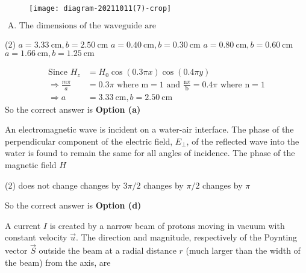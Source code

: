 \begin{enumerate}
\begin{minipage}{\textwidth}
		\begin{figure}[H]
			\centering
			\texttt{[image: diagram-20211011(7)-crop]}
		\end{figure}
	\end{minipage}
	$\text { A. The dimensions of the waveguide are }$
	\begin{tasks}(2)
		\task[\textbf{a.}] $a=3.33 \mathrm{~cm}, b=2.50 \mathrm{~cm}$
		\task[\textbf{b.}]$a=0.40 \mathrm{~cm}, b=0.30 \mathrm{~cm}$
		\task[\textbf{c.}]$a=0.80 \mathrm{~cm}, b=0.60 \mathrm{~cm}$
		\task[\textbf{d.}] $a=1.66 \mathrm{~cm}, b=1.25 \mathrm{~cm}$
	\end{tasks}
	\begin{answer}
		\begin{align*}
		\text{Since }H_{z}&=H_{0} \cos (0.3 \pi x) \cos (0.4 \pi y)\\
		\Rightarrow \frac{m \pi}{a}&=0.3 \pi\text{ where }\mathrm{m}=1\text{ and }\frac{\mathrm{n} \pi}{\mathrm{b}}=0.4 \pi\text{ where }\mathrm{n}=1\\
		\Rightarrow a&=3.33 \mathrm{~cm}, b=2.50 \mathrm{~cm}
		\end{align*}
		So the correct answer is \textbf{Option (a)}
	\end{answer}
	\begin{minipage}{\textwidth}
		\item An electromagnetic wave is incident on a water-air interface. The phase of the perpendicular component of the electric field, $E_{\perp}$, of the reflected wave into the water is found to remain the same for all angles of incidence. The phase of the magnetic field $H$
	\end{minipage}
	\begin{tasks}(2)
		\task[\textbf{a.}]does not change
		\task[\textbf{b.}]changes by $3 \pi / 2$
		\task[\textbf{c.}]changes by $\pi / 2$
		\task[\textbf{d.}]changes by $\pi$
	\end{tasks}
	\begin{answer}
		So the correct answer is \textbf{Option (d)}
	\end{answer}
	\begin{minipage}{\textwidth}
		\item A current $I$ is created by a narrow beam of protons moving in vacuum with constant velocity $\vec{u}$. The direction and magnitude, respectively of the Poynting vector $\vec{S}$ outside the beam at a radial distance $r$ (much larger than the width of the beam) from the axis, are

\end{minipage}
\end{enumerate}
